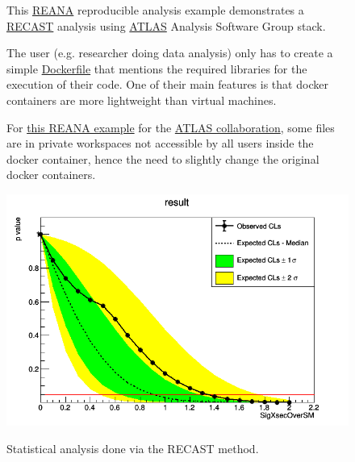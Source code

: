 \begin{figure}[H]
    \centering
    \begin{minipage}[H]{0.49\textwidth}
This \href{http://www.reana.io}{REANA} reproducible analysis example demonstrates
a \href{https://indico.cern.ch/event/525142/contributions/2190137/attachments/1291681/1924055/RECAST-CAP-Reinterpretation-Workshop.pdf}{RECAST}\cite{recast-paper} analysis using \href{https://atlas.cern}{ATLAS} Analysis Software Group stack.

\vspace{1em}

\noindent
The user (e.g. researcher doing data analysis) only has to create a simple \href{https://github.com/reanahub/reana-demo-atlas-recast/blob/master/eventselection/Dockerfile}{Dockerfile} that mentions the required libraries for the execution of their code. One of their main features is that docker containers are more lightweight than virtual machines.

\vspace{1em}

\noindent
For \href{https://github.com/reanahub/reana-demo-atlas-recast}{this REANA example} for the \href{https://atlas.cern/}{ATLAS collaboration}, some files are in private workspaces not accessible by all users inside the docker container, hence the need to slightly change the original docker containers.
     \end{minipage}
 \hfill
    \begin{minipage}[H]{0.49\textwidth}
        \centering
        \includegraphics[width=1.0\textwidth]{figures/atlas_limit.png}\\
        \caption{Statistical analysis done via the RECAST method.}
        \label{fig:atlas_limit}
     \end{minipage}
\end{figure}



